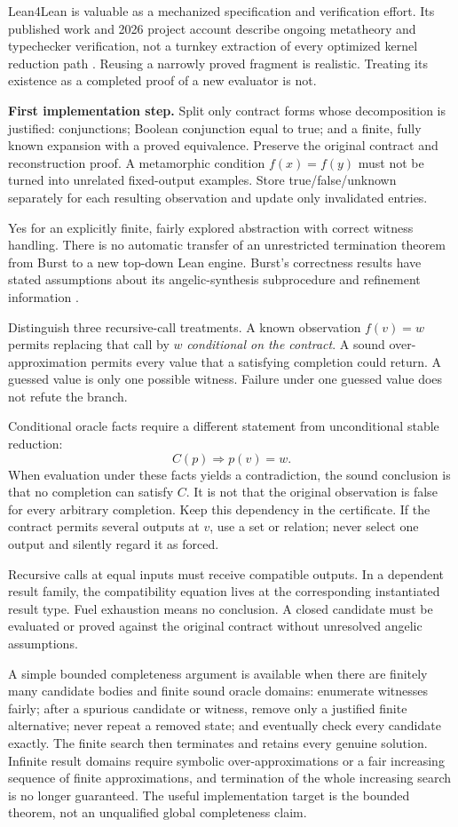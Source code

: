 Lean4Lean is valuable as a mechanized specification and verification effort. Its published work and 2026 project account describe ongoing metatheory and typechecker verification, not a turnkey extraction of every optimized kernel reduction path \cite{lean4lean,lean4lean2026}. Reusing a narrowly proved fragment is realistic. Treating its existence as a completed proof of a new evaluator is not.

\textbf{First implementation step.} Split only contract forms whose decomposition is justified: conjunctions; Boolean conjunction equal to true; and a finite, fully known  expansion with a proved equivalence. Preserve the original contract and reconstruction proof. A metamorphic condition $f(x)=f(y)$ must not be turned into unrelated fixed-output examples. Store true/false/unknown separately for each resulting observation and update only invalidated entries.

\ans Yes for an explicitly finite, fairly explored abstraction with correct witness handling. There is no automatic transfer of an unrestricted termination theorem from Burst to a new top-down Lean engine. Burst's correctness results have stated assumptions about its angelic-synthesis subprocedure and refinement information \cite{burst}.

Distinguish three recursive-call treatments. A known observation $f(v)=w$ permits replacing that call by $w$ \emph{conditional on the contract}. A sound over-approximation permits every value that a satisfying completion could return. A guessed value is only one possible witness. Failure under one guessed value does not refute the branch.

Conditional oracle facts require a different statement from unconditional stable reduction:
\[
  C(p)\Longrightarrow p(v)=w.
\]
When evaluation under these facts yields a contradiction, the sound conclusion is that no completion can satisfy $C$. It is not that the original observation is false for every arbitrary completion. Keep this dependency in the certificate. If the contract permits several outputs at $v$, use a set or relation; never select one output and silently regard it as forced.

Recursive calls at equal inputs must receive compatible outputs. In a dependent result family, the compatibility equation lives at the corresponding instantiated result type. Fuel exhaustion means no conclusion. A closed candidate must be evaluated or proved against the original contract without unresolved angelic assumptions.

A simple bounded completeness argument is available when there are finitely many candidate bodies and finite sound oracle domains: enumerate witnesses fairly; after a spurious candidate or witness, remove only a justified finite alternative; never repeat a removed state; and eventually check every candidate exactly. The finite search then terminates and retains every genuine solution. Infinite result domains require symbolic over-approximations or a fair increasing sequence of finite approximations, and termination of the whole increasing search is no longer guaranteed. The useful implementation target is the bounded theorem, not an unqualified global completeness claim.
